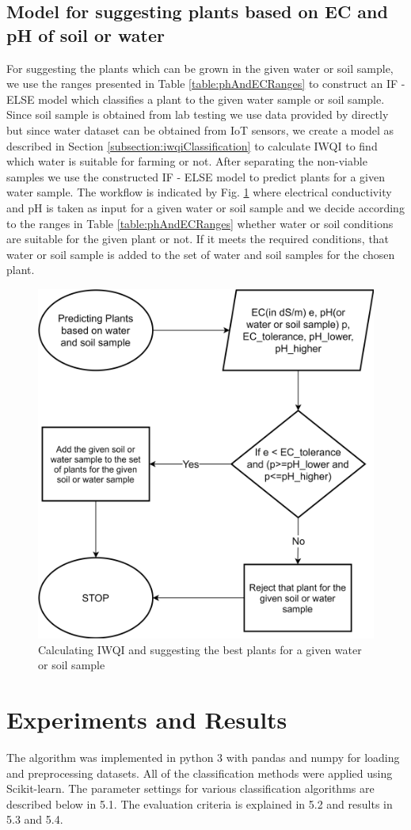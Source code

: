\subsection{Model for suggesting plants based on EC and pH of soil or water}
\label{subsection:plantSelection}
For suggesting the plants which can be grown in the given water or soil sample, we use the ranges presented in Table \ref{table:phAndECRanges} to construct an IF - ELSE model which classifies a plant to the given water sample or soil sample. Since soil sample is obtained from lab testing we use data provided by \cite{dataset:lucas} directly but since water dataset can be obtained from IoT sensors, we create a model as described in Section \ref{subsection:iwqiClassification} to calculate IWQI to find which water is suitable for farming or not. After separating the non-viable samples we use the constructed IF - ELSE model to predict plants for a given water sample. 
The workflow is indicated by Fig. \ref{fig:phAndECRanges} where electrical conductivity and pH is taken as input for a given water or soil sample and we decide according to the ranges in Table \ref{table:phAndECRanges} whether water or soil conditions are suitable for the given plant or not. If it meets the required conditions, that water or soil sample is added to the set of water and soil samples for the chosen plant.

\begin{figure}[H]
\includegraphics[width=0.49\linewidth]{Model for suggesting plants.png}
\centering
\caption{Calculating IWQI and suggesting the best plants for a given water or soil sample}
\label{fig:phAndECRanges}
\end{figure}

\section{Experiments and Results}
\label{section:expAndRes}
The algorithm was implemented in python 3 with pandas and numpy for loading and preprocessing datasets. All of the classification methods were applied using Scikit-learn\cite{article:scikit-learn}. The parameter settings for various classification algorithms are described below in 5.1. The evaluation criteria is explained in 5.2 and results in 5.3 and 5.4. 

